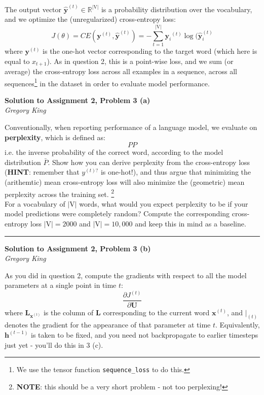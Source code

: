 \documentclass[letter,12pt]{article}
\newcommand{\myhwtitle}[3]
{\begin{center}
{\large {\bf Solution to Assignment {#1}, Problem {#2}}}\\
\medskip 
{\it {#3}} %
\end{center}}
\newcommand{\solutionsAuthor}{Gregory King}
\begin{document}
\noindent The output vector ${\hat{\boldsymbol y}}^{(t)}\in\mathbb{R}^{|\textrm{V}|}$ is a probability distribution over the vocabulary, and we optimize the (unregularized) cross-entropy loss:
\begin{equation}
J(\theta) = CE({{\boldsymbol y}}^{(t)},{\hat{\boldsymbol y}}^{(t)}) = -\sum^{|\textrm{V}|}_{t=1} {{\boldsymbol y_{i}}}^{(t)}\log({\hat{\boldsymbol y}}^{(t)}_{i}
\end{equation}
\noindent where ${{\boldsymbol y}}^{(t)}$ is the one-hot vector corresponding to the target word (which here is equal to $x_{t+1}$). As in question 2, this is a point-wise loss, and we sum (or average) the cross-entropy loss across all examples in a sequence, across all sequences\footnote{We use the tensor function \texttt{sequence\_loss} to do this.} in the dataset in order to evaluate model performance. \\
\clearpage
\myhwtitle{2}{3 (a)}{\solutionsAuthor}

\noindent Conventionally, when reporting performance of a language model, we evaluate on \textbf{perplexity}, which is defined as:
\begin{equation}
PP
\end{equation}
i.e. the inverse probability of the correct word, according to  the model distribution $\bar{P}$. Show how you can derive perplexity from the cross-entropy loss (\textbf{HINT}: remember that $y^{(t)?}$ is one-hot!), and thus argue that minimizing the (arithemtic) mean cross-entropy loss will also minimize the (geometric) mean perplexity across the training set. \footnote{\textbf{NOTE}: this should be a very short problem - not too perplexing!}\\

\noindent For a vocabulary of $|\textrm{V}|$ words, what would you expect perplexity to be if your model predictions were completely random? Compute the corresponding cross-entropy loss $|\textrm{V}|=2000$ and $|\textrm{V}|=10,000$ and keep this in mind as a baseline.\vspace{5mm}\\

\noindent\rule{\textwidth}{0.4pt}

\clearpage

\myhwtitle{2}{3 (b)}{\solutionsAuthor}

\bigskip

\noindent As you did in question 2, compute the gradients with respect to all the model parameters at a single point in time $t$:
\begin{equation}
\frac{\partial{J^(t)}}{\partial{\boldsymbol U}}
\end{equation}
where ${\boldsymbol L}_{{\boldsymbol x}^{(t)}}$ is the column of ${\boldsymbol L}$ corresponding to the current word ${{\boldsymbol x}^{(t)}}$, and $\big\rvert_{(t)}$ denotes the gradient for the appearance of that parameter at time $t$. Equivalently, ${\boldsymbol h}^{(t-1)}$ is taken to be fixed, and you need not backpropagate to earlier timesteps just yet - you'll do this in 3 (c). \\
\end{document}
